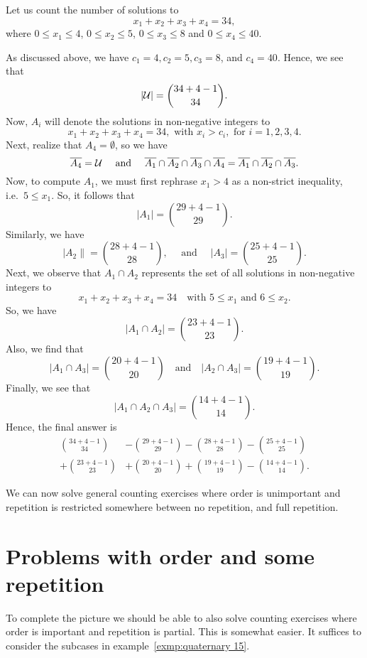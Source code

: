 \begin{exmp}
 Let us count the number of solutions to 
 \[
 x_1+x_2+x_3+x_4=34,
 \]
 where
 $0\leq x_1\leq 4$, $0\leq x_2\leq 5$, $0\leq x_3\leq 8$ and $0\leq x_4\leq 40$.
 
 As discussed above, we
 have $c_1=4, c_2=5, c_3=8$, and $c_4=40$. Hence, we see that 
 \[
 \left\lvert {\cal {U}}\right\rvert=\binom{34+4-1}{34}.
 \]
 Now, $A_i$ will denote the solutions in non-negative
 integers to 
 \[
 x_1+x_2+x_3+x_4=34, \text{ with } x_i>c_i, \text{ for } i=1,2,3,4.
 \]
 Next, realize that $A_4=\emptyset$, so we have 
 \[
 \overline{A_4}={\cal {U}} \quad\text{ and }\quad 
 \overline{A_1}\cap \overline{A_2}\cap \overline{A_3}\cap \overline{A_4}=\overline{A_1}\cap \overline{A_2}\cap \overline{A_3}.
 \]
 Now, to compute $A_1$, we must first rephrase $x_1>4$ as a non-strict inequality, i.e.~$5\leq x_1$.
 So, it follows that 
 \[
 {|A_1|={29+4-1\choose 29}}.
 \]
 Similarly, we have
 \[
  \lvert A_2\rVert=\binom{28+4-1}{28}, \quad\text{ and }\quad
 \lvert A_3\rvert=\binom{25+4-1}{25}.
 \] 
 Next, we observe that $A_1\cap A_2$ represents the set of  all solutions in non-negative
 integers to
 \[
 x_1+x_2+x_3+x_4=34 \quad\text{with $5\leq x_1$ and $6\leq x_2$}.
 \]
  So, we have 
 \[
 \left\lvert A_1\cap A_2\right\rvert=\binom{23+4-1}{23}.
 \]
  Also, we find that
 \[
  \lvert A_1\cap A_3\rvert=\binom{20+4-1}{20}
  \quad\text{and}\quad \lvert A_2\cap A_3\rvert=\binom{19+4-1}{19}.
 \]
  Finally, we see that
 \[
 \lvert A_1\cap A_2\cap A_3\rvert=
 \binom{14+4-1}{14}.
 \]
 Hence, the final answer is
\begin{align*}
  {34+4-1\choose 34}&-{29+4-1\choose 29}-{28+4-1\choose 28}-{25+4-1\choose 25}\\
  +{23+4-1\choose 23}&+{20+4-1\choose 20}+{19+4-1\choose 19}-{14+4-1\choose 14}.
\end{align*}
\end{exmp}

We can now solve general counting exercises where order is unimportant and repetition is restricted
somewhere between no repetition, and full repetition.


\section{Problems with order and some repetition}
To complete the picture we should be able to also solve counting exercises where order is important
and repetition is partial. This is somewhat easier. It suffices to consider the subcases in
 example~\ref{exmp:quaternary 15}.


